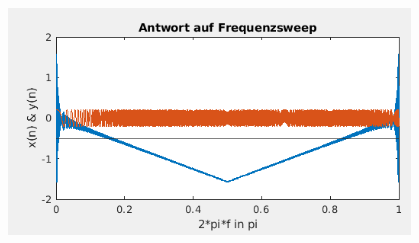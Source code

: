 \documentclass{beamer}
\begin{document}
\begin{frame}
\begin{columns}
\begin{column}{0.5\textwidth}
		\end{column}
		\begin{column}{0.5\textwidth}
			\begin{figure}
				\centering
				\includegraphics[width=0.8\linewidth]{images/fm_demod_sweep}
				\label{fig:fmdemodsweep}
			\end{figure}
			
		\end{column}
	\end{columns}
\end{frame}
\end{document}
